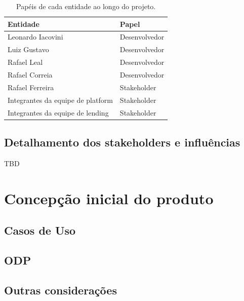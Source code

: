\documentclass[twosideprint]{politex}
\begin{document}
\begin{table}[ht]
\centering
\begin{tabular}{l l}
Entidade & Papel \\
\hline
Leonardo Iacovini   &   Desenvolvedor  \\
Luiz Gustavo &  Desenvolvedor  \\
Rafael Leal   &  Desenvolvedor \\
Rafael Correia   &  Desenvolvedor \\
Rafael Ferreira   &  Stakeholder \\
Integrantes da equipe de platform   &  Stakeholder \\
Integrantes da equipe de lending   &  Stakeholder 
\end{tabular}
\caption{Papéis de cada entidade ao longo do projeto.}
\label{tab:roles}
\end{table}
\subsection{Detalhamento dos stakeholders e influências}
TBD

\section{Concepção inicial do produto}
\subsection{Casos de Uso}
\subsection{ODP}
\subsection{Outras considerações}
\end{document}
